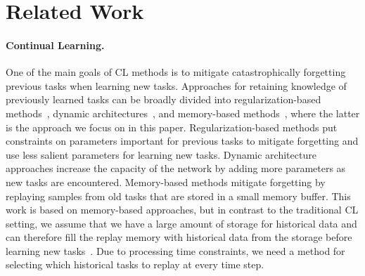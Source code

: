 
\section{Related Work}\label{paperD:sec:related_work}


\paragraph{Continual Learning.} One of the main goals of CL methods is to mitigate catastrophically forgetting previous tasks when learning new tasks. Approaches for retaining knowledge of previously learned tasks can be broadly divided into regularization-based methods~, dynamic architectures~, and memory-based methods~, where the latter is the approach we focus on in this paper. Regularization-based methods put constraints on parameters important for previous tasks to mitigate forgetting and use less salient parameters for learning new tasks. Dynamic architecture approaches increase the capacity of the network by adding more parameters as new tasks are encountered. Memory-based methods mitigate forgetting by replaying samples from old tasks that are stored in a small memory buffer. This work is based on memory-based approaches, but in contrast to the traditional CL setting, we assume that we have a large amount of storage for historical data and can therefore fill the replay memory with historical data from the storage before learning new tasks~. Due to processing time constraints, we need a method for selecting which historical tasks to replay at every time step.   


